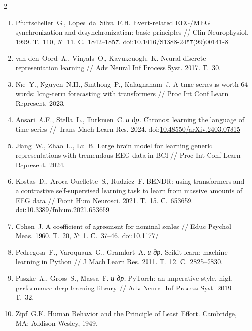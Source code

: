 \documentclass[14pt,a4paper]{extarticle}
\begin{document}
\begin{multicols}{2}
\begin{otherlanguage}{russian}
\begin{enumerate}[leftmargin=*,label={\arabic*.},itemsep=3pt,topsep=4pt]
\item Pfurtscheller~G., Lopes~da~Silva~F.H.
Event-related EEG/MEG synchronization and desynchronization: basic principles
// Clin Neurophysiol. 1999. Т.~110, №~11. С.~1842--1857.
doi:\href{https://doi.org/10.1016/S1388-2457(99)00141-8}{10.1016/S1388-2457(99)00141-8}


\item van den~Oord~A., Vinyals~O., Kavukcuoglu~K.
Neural discrete representation learning
// Adv Neural Inf Process Syst. 2017. Т.~30.

\item Nie~Y., Nguyen~N.H., Sinthong~P., Kalagnanam~J.
A time series is worth 64 words: long-term forecasting with transformers
// Proc Int Conf Learn Represent. 2023.

\item Ansari~A.F., Stella~L., Turkmen~C. \textit{и др.}
Chronos: learning the language of time series
// Trans Mach Learn Res. 2024.
doi:\href{https://doi.org/10.48550/arXiv.2403.07815}{10.48550/arXiv.2403.07815}

\item Jiang~W., Zhao~L., Lu~B.
Large brain model for learning generic representations with tremendous EEG data in BCI
// Proc Int Conf Learn Represent. 2024.

\item Kostas~D., Aroca-Ouellette~S., Rudzicz~F.
BENDR: using transformers and a contrastive self-supervised learning task to learn from massive amounts of EEG data
// Front Hum Neurosci. 2021. Т.~15. С.~653659.
doi:\href{https://doi.org/10.3389/fnhum.2021.653659}{10.3389/fnhum.2021.653659}

\item Cohen~J.
A coefficient of agreement for nominal scales
// Educ Psychol Meas. 1960. Т.~20, №~1. С.~37--46.
doi:\href{https://doi.org/10.1177/001316446002000104}{10.1177/}

\item Pedregosa~F., Varoquaux~G., Gramfort~A. \textit{и др.}
Scikit-learn: machine learning in Python
// J Mach Learn Res. 2011. Т.~12. С.~2825--2830.

\item Paszke~A., Gross~S., Massa~F. \textit{и др.}
PyTorch: an imperative style, high-performance deep learning library
// Adv Neural Inf Process Syst. 2019. Т.~32.

\item Zipf~G.K.
Human Behavior and the Principle of Least Effort.
Cambridge, MA: Addison-Wesley, 1949.


\end{enumerate}
\end{otherlanguage}
\end{multicols}
\end{document}
